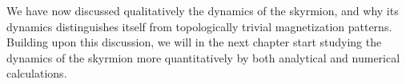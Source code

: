 We have now discussed qualitatively the dynamics of the skyrmion, and why its dynamics distinguishes itself from topologically trivial magnetization patterns. Building upon this discussion, we will in the next chapter start studying the dynamics of the skyrmion more quantitatively by both analytical and numerical calculations.